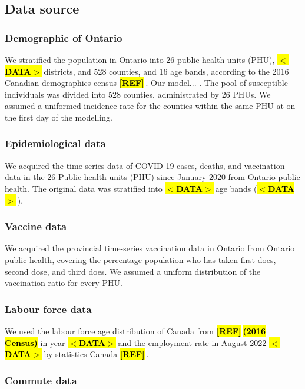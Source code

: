 \documentclass[12pt]{article}
\newcommand{\emphasize}[1]{\textcolor{ReD}{\textbf{\hl{#1}}}}
\newcommand{\pendingref}{\textbf{\hl{[REF]}}$ \ $}
\newcommand{\pendingdata}{\textbf{\hl{$<$DATA$>$}}$ \ $}
\begin{document}
\subsection{Data source}

\subsubsection{Demographic of Ontario}

We stratified the population in Ontario into 26 public health units (PHU), \pendingdata districts, and 528 counties, and 16 age bands, according to the 2016 Canadian demographics census \pendingref. Our model... . The pool of susceptible individuals was divided into 528 counties, administrated by 26 PHUs. We assumed a uniformed incidence rate for the counties within the same PHU at on the first day of the modelling. 


\subsubsection{Epidemiological data}

We acquired the time-series data of COVID-19 cases, deaths, and vaccination data in the 26 Public health units (PHU) since January 2020 from Ontario public health. \cite{ref1} The original data was stratified into \pendingdata age bands (\pendingdata).

\subsubsection{Vaccine data}

We acquired the provincial time-series vaccination data in Ontario from Ontario public health, covering the percentage population who has taken first does, second dose, and third does. We assumed a uniform distribution of the vaccination ratio for every PHU.  

\subsubsection{Labour force data}

We used the labour force age distribution of Canada from \pendingref \emphasize{(2016 Census)} in year \pendingdata and the employment rate in August 2022 \pendingdata by statistics Canada \pendingref. 

\subsubsection{Commute data}
\end{document}
